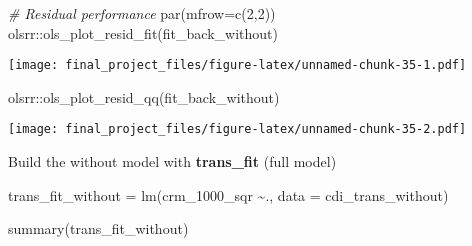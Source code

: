 \documentclass[
]{article}
\newenvironment{Shaded}{\begin{snugshade}}{\end{snugshade}}
\newcommand{\AttributeTok}[1]{\textcolor[rgb]{0.77,0.63,0.00}{#1}}
\newcommand{\CommentTok}[1]{\textcolor[rgb]{0.56,0.35,0.01}{\textit{#1}}}
\newcommand{\DecValTok}[1]{\textcolor[rgb]{0.00,0.00,0.81}{#1}}
\newcommand{\FunctionTok}[1]{\textcolor[rgb]{0.00,0.00,0.00}{#1}}
\newcommand{\NormalTok}[1]{#1}
\newcommand{\OtherTok}[1]{\textcolor[rgb]{0.56,0.35,0.01}{#1}}
\newcommand{\SpecialCharTok}[1]{\textcolor[rgb]{0.00,0.00,0.00}{#1}}
\begin{document}
\begin{Shaded}
\begin{Highlighting}[]
\CommentTok{\# Residual performance}
\FunctionTok{par}\NormalTok{(}\AttributeTok{mfrow=}\FunctionTok{c}\NormalTok{(}\DecValTok{2}\NormalTok{,}\DecValTok{2}\NormalTok{))}
\NormalTok{olsrr}\SpecialCharTok{::}\FunctionTok{ols\_plot\_resid\_fit}\NormalTok{(fit\_back\_without)}
\end{Highlighting}
\end{Shaded}

\texttt{[image: final\_project\_files/figure-latex/unnamed-chunk-35-1.pdf]}

\begin{Shaded}
\begin{Highlighting}[]
\NormalTok{olsrr}\SpecialCharTok{::}\FunctionTok{ols\_plot\_resid\_qq}\NormalTok{(fit\_back\_without)}
\end{Highlighting}
\end{Shaded}

\texttt{[image: final\_project\_files/figure-latex/unnamed-chunk-35-2.pdf]}

Build the without model with \textbf{trans\_fit} (full model)

\begin{Shaded}
\begin{Highlighting}[]
\NormalTok{trans\_fit\_without }\OtherTok{=} \FunctionTok{lm}\NormalTok{(crm\_1000\_sqr }\SpecialCharTok{\textasciitilde{}}\NormalTok{., }\AttributeTok{data =}\NormalTok{ cdi\_trans\_without)}

\FunctionTok{summary}\NormalTok{(trans\_fit\_without)}
\end{Highlighting}
\end{Shaded}
\end{document}
